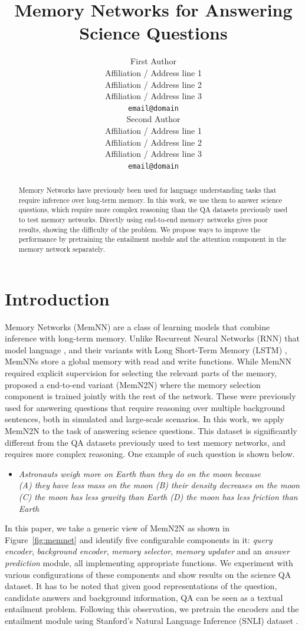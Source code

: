 \documentclass[11pt]{article}
\title{Memory Networks for Answering Science Questions}
\author{First Author \\
  Affiliation / Address line 1 \\
  Affiliation / Address line 2 \\
  Affiliation / Address line 3 \\
  {\tt email@domain} \\\And
  Second Author \\
  Affiliation / Address line 1 \\
  Affiliation / Address line 2 \\
  Affiliation / Address line 3 \\
  {\tt email@domain} \\}
\date{}
\begin{document}
\maketitle
\begin{abstract}
Memory Networks have previously been used for language understanding tasks that require inference over long-term memory. In this work, we use them to answer science questions, which require more complex reasoning than the QA datasets previously used to test memory networks. Directly using end-to-end memory networks gives poor results, showing the difficulty of the problem. We propose ways to improve the performance by pretraining the entailment module and the attention component in the memory network separately.
\end{abstract}
\section{Introduction}
Memory Networks (MemNN) \cite{weston2014memory} are a class of learning models that combine inference with long-term memory. Unlike Recurrent Neural Networks (RNN) that model language \cite{mikolov2010recurrent}, and their variants with Long Short-Term Memory (LSTM) \cite{hochreiter1997long}, MemNNs store a global memory with read and write functions. While MemNN required explicit supervision for selecting the relevant parts of the memory,  proposed a end-to-end variant (MemN2N) where the memory selection component is trained jointly with the rest of the network. These were previously used for answering questions that require reasoning over multiple background sentences, both in simulated \cite{bordes2010towards} and large-scale \cite{fader2013paraphrase} scenarios. In this work, we apply MemN2N to the task of answering science questions. This dataset is significantly different from the QA datasets previously used to test memory networks, and requires more complex reasoning. One example of such question is shown below.
\begin{itemize}
\item \textit{Astronauts weigh more on Earth than they do on the moon because \\
(A) they have less mass on the moon (B) their density decreases on the moon (C) the moon has less gravity than Earth (D) the moon has less friction than Earth}
\end{itemize}
In this paper, we take a generic view of MemN2N as shown in Figure~\ref{fig:memnet} and identify five configurable components in it: \textit{query encoder}, \textit{background encoder}, \textit{memory selector}, \textit{memory updater} and an \textit{answer prediction} module, all implementing appropriate functions. We experiment with various configurations of these components and show results on the science QA dataset. It has to be noted that given good representations of the question, candidate answers and background information, QA can be seen as a textual entailment problem. Following this observation, we pretrain the encoders and the entailment module using Stanford's Natural Language Inference (SNLI) dataset \cite{bowman2015large}.
\end{document}
